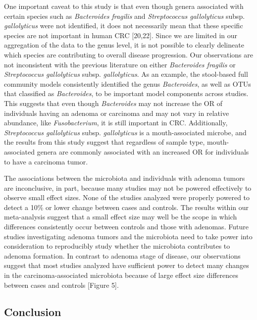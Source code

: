 \documentclass[12pt,]{article}
\begin{document}
One important caveat to this study is that even though genera associated
with certain species such as \emph{Bacteroides fragilis} and
\emph{Streptococcus gallolyticus} subsp. \emph{gallolyticus} were not
identified, it does not necessarily mean that these specific species are
not important in human CRC {[}20,22{]}. Since we are limited in our
aggregation of the data to the genus level, it is not possible to
clearly delineate which species are contributing to overall disease
progression. Our observations are not inconsistent with the previous
literature on either \emph{Bacteroides fragilis} or \emph{Streptococcus
gallolyticus} subsp. \emph{gallolyticus}. As an example, the stool-based
full community models consistently identified the genus
\emph{Bacteroides}, as well as OTUs that classified as
\emph{Bacteroides}, to be important model components across studies.
This suggests that even though \emph{Bacteroides} may not increase the
OR of individuals having an adenoma or carcinoma and may not vary in
relative abundance, like \emph{Fusobacterium}, it is still important in
CRC. Additionally, \emph{Streptococcus gallolyticus} subsp.
\emph{gallolyticus} is a mouth-associated microbe, and the results from
this study suggest that regardless of sample type, mouth-associated
genera are commonly associated with an increased OR for individuals to
have a carcinoma tumor.

The associations between the microbiota and individuals with adenoma
tumors are inconclusive, in part, because many studies may not be
powered effectively to observe small effect sizes. None of the studies
analyzed were properly powered to detect a 10\% or lower change between
cases and controls. The results within our meta-analysis suggest that a
small effect size may well be the scope in which differences
consistently occur between controls and those with adenomas. Future
studies investigating adenoma tumors and the microbiota need to take
power into consideration to reproducibly study whether the microbiota
contributes to adenoma formation. In contrast to adenoma stage of
disease, our observations suggest that most studies analyzed have
sufficient power to detect many changes in the carcinoma-associated
microbiota because of large effect size differences between cases and
controls {[}Figure 5{]}.

\newpage

\subsection{Conclusion}\label{conclusion}
\end{document}
